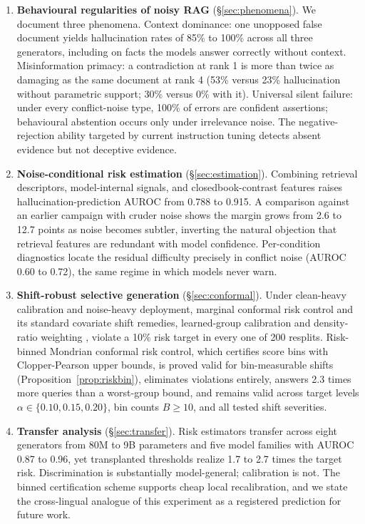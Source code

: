 \documentclass[11pt]{article}
\begin{document}
\begin{enumerate}
\item \textbf{Behavioural regularities of noisy RAG}
(\S\ref{sec:phenomena}). We document three phenomena. Context
dominance: one unopposed false document yields hallucination rates of
85\% to 100\% across all three generators, including on facts the
models answer correctly without context. Misinformation primacy: a
contradiction at rank 1 is more than twice as damaging as the same
document at rank 4 (53\% versus 23\% hallucination without parametric
support; 30\% versus 0\% with it). Universal silent failure: under
every conflict-noise type, 100\% of errors are confident assertions;
behavioural abstention occurs only under irrelevance noise. The
negative-rejection ability targeted by current instruction tuning
\citep{chen2023rgb,zhang2024rtuning} detects absent evidence but not
deceptive evidence.
\item \textbf{Noise-conditional risk estimation}
(\S\ref{sec:estimation}). Combining retrieval descriptors,
model-internal signals, and closedbook-contrast features raises
hallucination-prediction AUROC from 0.788 to 0.915. A comparison
against an earlier campaign with cruder noise shows the margin grows
from 2.6 to 12.7 points as noise becomes subtler, inverting the natural
objection that retrieval features are redundant with model confidence.
Per-condition diagnostics locate the residual difficulty precisely in
conflict noise (AUROC 0.60 to 0.72), the same regime in which models
never warn.
\item \textbf{Shift-robust selective generation}
(\S\ref{sec:conformal}). Under clean-heavy calibration and noise-heavy
deployment, marginal conformal risk control and its standard covariate
shift remedies, learned-group calibration and density-ratio weighting
\citep{tibshirani2019covariate}, violate a 10\% risk target in every
one of 200 resplits. Risk-binned Mondrian conformal risk control,
which certifies score bins with Clopper-Pearson upper bounds, is proved
valid for bin-measurable shifts (Proposition~\ref{prop:riskbin}),
eliminates violations entirely, answers 2.3 times more queries than a
worst-group bound, and remains valid across target levels
$\alpha \in \{0.10, 0.15, 0.20\}$, bin counts $B \ge 10$, and all
tested shift severities.
\item \textbf{Transfer analysis} (\S\ref{sec:transfer}). Risk
estimators transfer across eight generators from 80M to 9B parameters
and five model families with AUROC 0.87 to 0.96, yet
transplanted thresholds realize 1.7 to 2.7 times the target risk.
Discrimination is substantially model-general; calibration is not. The
binned certification scheme supports cheap local recalibration, and we
state the cross-lingual analogue of this experiment as a registered
prediction for future work.
\end{enumerate}
\end{document}
